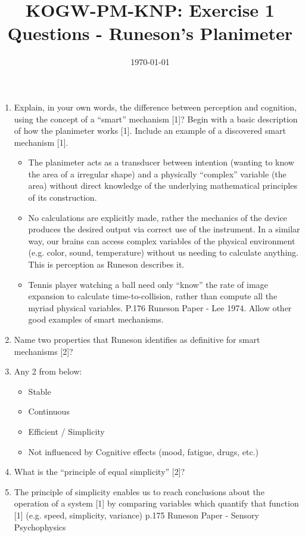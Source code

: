 \documentclass[12pt,english]{scrartcl}
\title{KOGW-PM-KNP:  Exercise 1 Questions - Runeson’s Planimeter}
\author{}
\date{\today}
\begin{document}
\maketitle

\begin{enumerate}

 \item Explain, in your own words, the difference between perception and cognition, using the concept of a “smart” mechanism [1]? Begin with a basic description of how the planimeter works [1]. Include an example of a discovered smart mechanism [1].
  \begin{itemize}
  \color{blue} 
  \item The planimeter acts as a transducer between intention (wanting to know the area of a irregular shape) and a physically “complex” variable (the area) without direct knowledge of the underlying mathematical principles of its construction. 
  \item No calculations are explicitly made, rather the mechanics of the device produces the desired output via correct use of the instrument. In a similar way, our brains can access complex variables of the physical environment (e.g. color, sound, temperature) without us needing to calculate anything.  This is perception as Runeson describes it.
  \item Tennis player watching a ball need only “know” the rate of image expansion to calculate time-to-collision, rather than compute all the myriad physical variables. P.176 Runeson Paper - Lee 1974. Allow other good examples of smart mechanisms.
  \end{itemize}
  
 \item Name two properties that Runeson identifies as definitive for smart mechanisms [2]?
  \color{blue}
  \item[]
  Any 2 from below:
  \begin{itemize}
  \item Stable 
  \item Continuous 
  \item Efficient / Simplicity
  \item Not influenced by Cognitive effects (mood, fatigue, drugs, etc.)
  \end{itemize}
 
 \color{black}
 \item What is the “principle of equal simplicity” [2]?
   \color{blue}
   \item[]
   The principle of simplicity enables us to reach conclusions about the operation of a system [1] by comparing variables which quantify that function [1] (e.g. speed, simplicity, variance) p.175 Runeson Paper - Sensory Psychophysics
 

\end{enumerate}
\end{document}
